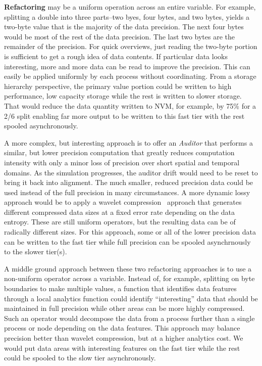 \documentclass[letterpaper,twocolumn,10pt]{article}
\begin{document}
\noindent\textbf{Refactoring} may be a uniform operation across an
entire variable. For example, splitting a double into three parts--two byes,
four bytes, and two bytes, yields a two-byte value that is the majority of the
data precision. The next four bytes would be most of the rest of the data
precision. The last two bytes are the remainder of the precision. For quick
overviews, just reading the two-byte portion is sufficient to get a rough idea
of data contents. If particular data looks interesting, more and more data can
be read to improve the precision. This can easily be applied uniformly by each
process without coordinating. From a storage hierarchy perspective, the primary
value portion could be written to high performance, low capacity storage while
the rest is written to slower storage. That would reduce the data quantity
written to NVM, for example, by 75\% for a 2/6 split enabling far more output
to be written to this fast tier with the rest spooled asynchronously.

A more complex, but interesting approach is to offer an {\em Auditor} that
performs a similar, but lower precision computation that greatly reduces
computation intensity with only a minor loss of precision over short spatial
and temporal domains. As the simulation progresses, the auditor drift would
need to be reset to bring it back into alignment. The much smaller, reduced
precision data could be used instead of the full precision in many
circumstances.  A more dynamic lossy approach would be to apply a wavelet
compression~\cite{klappenecker:1995:wavelet} approach that generates different
compressed data sizes at a fixed error rate depending on the data entropy.
These are still uniform operators, but the resulting data can be of radically
different sizes. For this approach, some or all of the lower precision data
can be written to the fast tier while full precision can be spooled
asynchrnously to the slower tier(s).

A middle ground approach between these two refactoring approaches is to use a
non-uniform operator across a variable. Instead of, for example, splitting on
byte boundaries to make multiple values, a function that identifies data
features through a local analytics function could identify ``interesting'' data
that should be maintained in full precision while other areas can be more
highly compressed. Such an operator would decompose the data from a process
further than a single process or node depending on the data features. This
approach may balance precision better than wavelet compression, but at a higher
analytics cost. We would put data areas with interesting features on the fast
tier while the rest could be spooled to the slow tier asynchronously.
\end{document}

